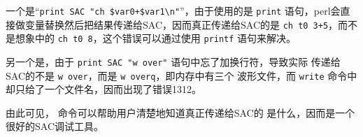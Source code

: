 一个是``\verb|print SAC "ch $var0+$var1\n"|''，由于使用的是 \texttt{print}
语句，perl会直接做变量替换然后把结果传递给SAC，因而真正传递给SAC的是
\texttt{ch t0 3+5}，而不是想象中的 \texttt{ch t0 8}，这个错误可以通过使用
\texttt{printf} 语句来解决。

另一个是，由于 \texttt{print SAC "w over"} 语句中忘了加换行符，导致实际
传递给SAC的不是 \texttt{w over}，而是 \texttt{w overq}，即内存中有三个
波形文件，而 \texttt{write} 命令中却只给了一个文件名，因而出现了错误1312。

由此可见， 命令可以帮助用户清楚地知道真正传递给SAC的
是什么，因而是一个很好的SAC调试工具。
